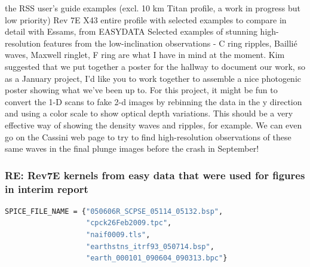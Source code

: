 \documentclass[crop=false,class=article,oneside]{standalone}
\begin{document}
the RSS user's guide examples (excl. 10 km Titan profile, a work in progress but low priority)
Rev 7E X43 entire profile with selected examples to compare in detail with Essams, from EASYDATA
Selected examples of stunning high-resolution features from the low-inclination observations - C ring ripples, Baillié waves, Maxwell ringlet, F ring are what I have in mind at the moment.
Kim suggested that we put together a poster for the hallway to document our work, so as a January project, I'd like you to work together to assemble a nice photogenic poster showing what we've been up to. For this project, it might be fun to convert the 1-D scans to fake 2-d images by rebinning the data in the y direction and using a color scale to show optical depth variations. This should be a very effective way of showing the density waves and ripples, for example. We can even go on the Cassini web page to try to find high-resolution observations of these same waves in the final plunge images before the crash in September!
\subsubsection{\footnotesize RE: Rev7E kernels from easy data that were used for figures in interim report}
\begin{lstlisting}[language=bash,basicstyle=\footnotesize]
SPICE_FILE_NAME = {"050606R_SCPSE_05114_05132.bsp",
                   "cpck26Feb2009.tpc",
                   "naif0009.tls",
                   "earthstns_itrf93_050714.bsp",
                   "earth_000101_090604_090313.bpc"}
\end{lstlisting}
\end{document}
